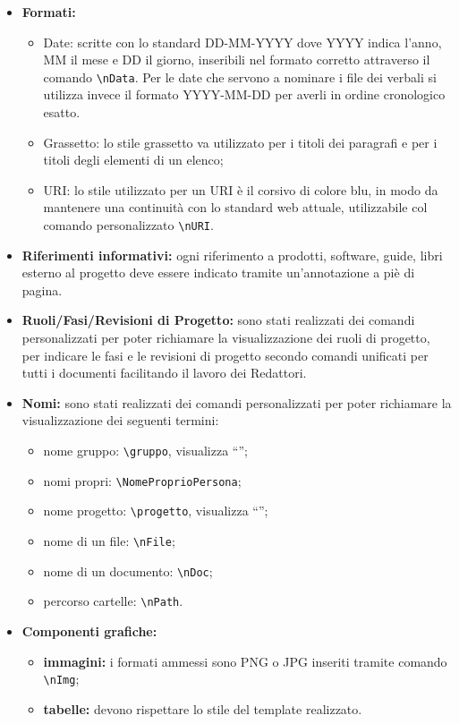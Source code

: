 \documentclass[NormeDiProgetto.tex]{subfiles}
\begin{document}
\begin{itemize}
			\item \textbf{Formati:}
			\begin{itemize}
				\item Date: scritte con lo standard DD-MM-YYYY dove YYYY indica l'anno, MM il mese e DD il giorno, inseribili nel formato corretto attraverso il comando \texttt{\textbackslash nData}. Per le date che servono a nominare i file dei verbali si utilizza invece il formato YYYY-MM-DD per averli in ordine cronologico esatto.
				\item Grassetto: lo stile grassetto va utilizzato per i titoli dei paragrafi e per i titoli degli elementi di un elenco; 
				\item URI: lo stile utilizzato per un URI è il corsivo di colore blu, in modo da mantenere una continuità con lo standard web attuale, utilizzabile col comando personalizzato  \texttt{\textbackslash nURI}.
			\end{itemize}
			
			\item \textbf{Riferimenti informativi:}
			ogni riferimento a prodotti, software, guide, libri esterno al progetto deve essere indicato tramite un'annotazione a piè di pagina.			
			
			\item \textbf{Ruoli/Fasi/Revisioni di Progetto:} sono stati realizzati dei comandi personalizzati per poter richiamare la visualizzazione dei ruoli di progetto, per indicare le fasi e le revisioni di progetto secondo comandi unificati per tutti i documenti facilitando il lavoro dei Redattori.
			
			\item \textbf{Nomi:} sono stati realizzati dei comandi personalizzati per poter richiamare la visualizzazione dei seguenti termini:
			\begin{itemize}
				\item nome gruppo: \texttt{\textbackslash gruppo}, visualizza \textquotedblleft \gruppo\textquotedblright;
				\item nomi propri: \texttt{\textbackslash NomeProprioPersona};
				\item nome progetto: \texttt{\textbackslash progetto}, visualizza \textquotedblleft \progetto\textquotedblright;
				\item nome di un file: \texttt{\textbackslash nFile};
				\item nome di un documento: \texttt{\textbackslash nDoc};
				\item percorso cartelle: \texttt{\textbackslash nPath}.
			\end{itemize}
		
			\item \textbf{Componenti grafiche:}
			 \begin{itemize}
			 	\item \textbf{immagini:} i formati ammessi sono PNG o JPG inseriti tramite comando \texttt{\textbackslash nImg}; 
			 	\item \textbf{tabelle:} devono rispettare lo stile del template realizzato.
			 \end{itemize}
			
		\end{itemize}
	
\end{document}
